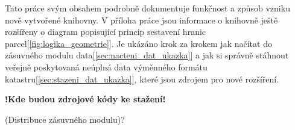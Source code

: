 Tato práce svým obsahem podrobně dokumentuje funkčnost a způsob vzniku nově vytvořené knihovny. V příloha práce jsou informace o knihovně ještě rozšířeny o diagram popisující princip sestavení hranic parcel[\ref{fig:logika_geometrie}]. Je ukázáno krok za krokem jak načítat do zásuvného modulu data[\ref{sec:nacteni_dat_ukazka}] a jak si správně stáhnout veřejně poskytovaná neúplná data výměnného formátu katastru[\ref{sec:stazeni_dat_ukazka}], které jsou zdrojem pro nové rozšíření.

\textbf{!Kde budou zdrojové kódy ke stažení!}

(Distribuce zásuvného modulu)?
